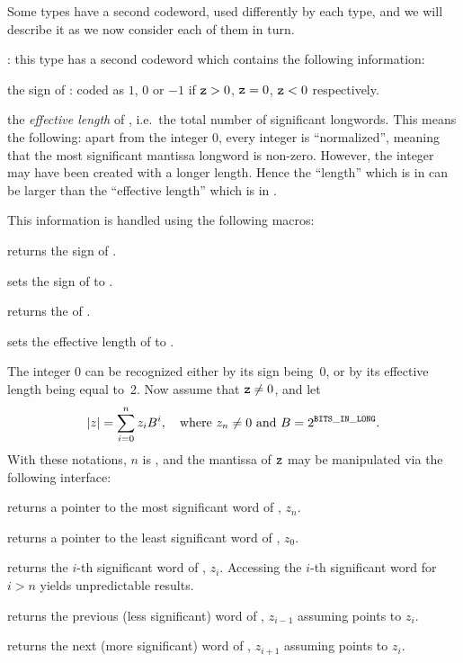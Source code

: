Some types have a second codeword, used differently by each type, and
we will describe it as we now consider each of them in turn.

: this type has
a second codeword  which contains the following information:

the sign of : coded as $1$, $0$ or $-1$ if ${\tt z} > 0$, ${\tt z} = 0$,
${\tt z} < 0$ respectively.

the \emph{effective length} of , i.e.~the total number of significant
longwords. This means the following: apart from the integer 0, every integer
is ``normalized'', meaning that the most significant mantissa longword is
non-zero. However, the integer may have been created with a longer length.
Hence the ``length'' which is in  can be larger than the
``effective length'' which is in .

\noindent This information is handled using the following macros:

 returns the sign of .

 sets the sign of  to .

 returns the  of .

 sets the effective length
of  to .

The integer 0 can be recognized either by its sign being~0, or by its
effective length being equal to~2. Now assume that ${\tt z} \ne 0$, and let
$$ |z| = \sum_{i = 0}^n z_i B^i,
  \quad{\rm where}~z_n\ne 0~{\rm and}~B = 2^{{\tt BITS\_IN\_LONG}}.
$$
With these notations, $n$ is , and the mantissa of
${\tt z}$ may be manipulated via the following interface:

 returns a pointer to the most significant word of
, $z_n$.

 returns a pointer to the least significant word of
, $z_0$.

 returns the $i$-th significant word of
, $z_i$. Accessing the $i$-th significant word for $i > n$
yields unpredictable results.

 returns the previous (less significant) word of
, $z_{i-1}$ assuming  points to $z_i$.

 returns the next (more significant) word of ,
$z_{i+1}$ assuming  points to $z_i$.

